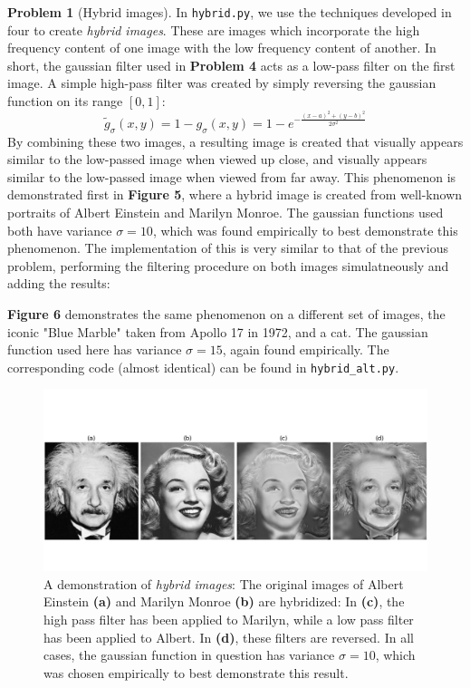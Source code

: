 \documentclass[10pt]{article}
\theoremstyle{plain}
\theoremstyle{definition}
\newtheorem{prob}{Problem}
\renewcommand{\tilde}[1]{\widetilde{#1}}%
\numberwithin{equation}{section}
\begin{document}
\hrulefill
\clearpage
\begin{prob}[Hybrid images]
    In \texttt{hybrid.py}, we use the techniques developed in four to create \textit{hybrid images}.
    These are images which incorporate the high frequency content of one image
    with the low frequency content of another. In short, the gaussian filter used in 
    \textbf{Problem 4} acts as a low-pass filter on the first image. A simple high-pass filter was created by
    simply reversing the gaussian function on its range ${[0,1]}$:
    \[
            \tilde{g}_\sigma(x,y) = 1 - g_\sigma(x,y) = 1 - e^{-\frac{(x-a)^2 + (y-b)^2}{2\sigma^2}}
        \]
    By combining these two images, a resulting image is created that visually appears
    similar to the low-passed image when viewed up close, and visually appears similar to the
    low-passed image when viewed from far away. This phenomenon is demonstrated first in
    \textbf{Figure 5}, where a hybrid image is created from well-known portraits of Albert
    Einstein and Marilyn Monroe. The gaussian functions used both have variance $\sigma=10$, which 
    was found empirically to best demonstrate this phenomenon.
    The implementation of this is very similar to that of the previous problem,
    performing the filtering procedure on both images simulatneously and adding the results:
    
    \textbf{Figure 6} demonstrates the
    same phenomenon on a different set of images,
    the iconic "Blue Marble" taken from Apollo 17 in 1972, and a cat. The gaussian function used here
    has variance $\sigma=15$, again found empirically. The corresponding code (almost identical)
    can be found in \texttt{hybrid\_alt.py}.
    \begin{figure}[p]
    \begin{center}
        \includegraphics[width=\textwidth]{prob5}
        \caption{
        A demonstration of \textit{hybrid images}: The original images of Albert Einstein \textbf{(a)} and
        Marilyn Monroe \textbf{(b)} are hybridized: In \textbf{(c)}, the high pass filter has been
        applied to Marilyn, while a low pass filter has been applied to Albert.
        In \textbf{(d)}, these filters are reversed. In all cases, the gaussian function in question
        has variance $\sigma=10$, which was chosen empirically to best demonstrate this result.
            }
    \end{center}
\end{figure}


\end{prob}
\end{document}
